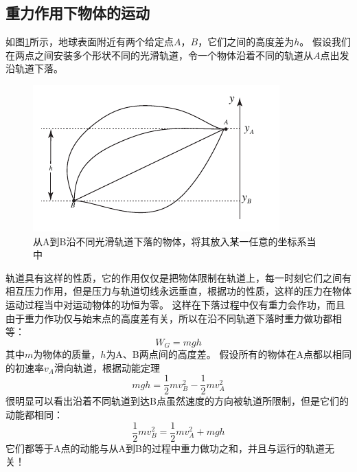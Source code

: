 \subsection{重力作用下物体的运动}
如图\ref{fig: 从A到B沿不同光滑轨道下落的物体，将其放入某一任意的坐标系当中}所示，地球表面附近有两个给定点$A$，$B$，它们之间的高度差为$h$。
假设我们在两点之间安装多个形状不同的光滑轨道，令一个物体沿着不同的轨道从$A$点出发沿轨道下落。
\begin{figure}
\begin{center}
\includegraphics{images/energy-4.pdf}
\caption{从A到B沿不同光滑轨道下落的物体，将其放入某一任意的坐标系当中}
\label{fig: 从A到B沿不同光滑轨道下落的物体，将其放入某一任意的坐标系当中}
\end{center}
\end{figure}
轨道具有这样的性质，它的作用仅仅是把物体限制在轨道上，每一时刻它们之间有相互压力作用，但是压力与轨道切线永远垂直，根据功的性质，这样的压力在物体运动过程当中对运动物体的功恒为零。
这样在下落过程中仅有重力会作功，而且由于重力作功仅与始末点的高度差有关，所以在沿不同轨道下落时重力做功都相等：
\begin{equation}
W_G = mgh
\end{equation}
其中$m$为物体的质量，$h$为A、B两点间的高度差。
假设所有的物体在A点都以相同的初速率$v_A$滑向轨道，根据动能定理
\begin{equation}
mgh  = \frac{1}{2}mv_B^2-\frac{1}{2}mv_A^2
\end{equation}
很明显可以看出沿着不同轨道到达B点虽然速度的方向被轨道所限制，但是它们的动能都相同：
\begin{equation}\label{eqn: energy-B点的动能}
\frac{1}{2}mv_B^2 = \frac{1}{2}mv_A^2 + mgh
\end{equation}
它们都等于A点的动能与从A到B的过程中重力做功之和，并且与运行的轨道无关！

